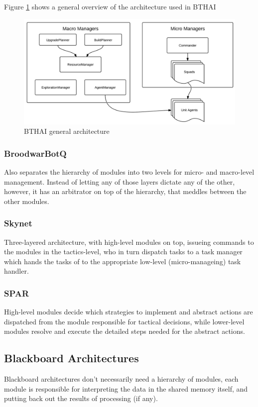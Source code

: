 Figure \ref{fig:bthaiarch} shows a general overview of the architecture used in BTHAI


\begin{figure}[h!tbp]
\centering
\includegraphics[scale=0.8]{graphics/bthai.png}
\caption{BTHAI general architecture}
\label{fig:bthaiarch}
\end{figure}

\subsubsection{BroodwarBotQ}
Also separates the hierarchy of modules into two levels for micro- and
macro-level management. Instead of letting any of those layers dictate any of
the other, however, it has an arbitrator on top of the hierarchy, that meddles
between the other modules.

\subsubsection{Skynet}
Three-layered architecture, with high-level modules on top, issueing commands
to the modules in the tactics-level, who in turn dispatch tasks to a task
manager which hands the tasks of to the appropriate low-level
(micro-manageing) task handler.

\subsubsection{SPAR}
High-level modules decide which strategies to implement and abstract actions
are dispatched from the module responsible for tactical decisions, while
lower-level modules resolve and execute the detailed steps needed for the
abstract actions.

\subsection{Blackboard Architectures}
Blackboard architectures don't necessarily need a hierarchy of modules, each
module is responsible for interpreting the data in the shared memory itself,
and putting back out the results of processing (if any).

